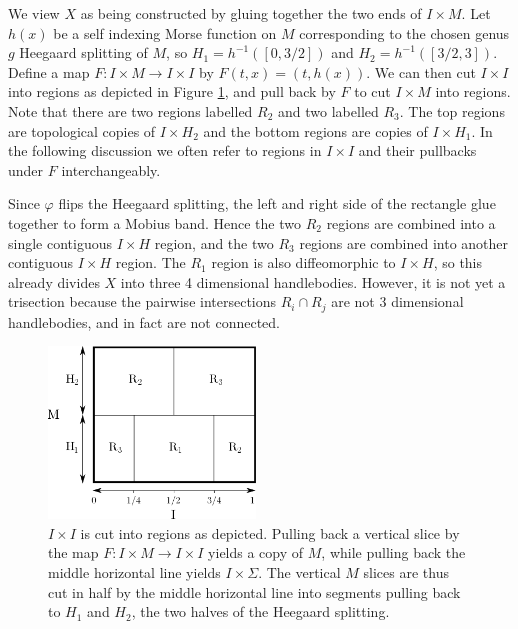 \documentclass[12pt]{amsart}
\theoremstyle{definition}
\theoremstyle{remark}
\begin{document}
We view $X$ as being constructed by gluing together the two ends of $I \times M$.  Let $h(x)$ be a self indexing Morse function on $M$ corresponding to the chosen genus $g$ Heegaard splitting of $M$, so $H_1 = h^{-1}([0,3/2])$ and $H_2  = h^{-1}([3/2,3])$. Define a map $F\colon I \times M \to I \times I$ by $F(t,x) = (t,h(x))$.  We can then cut $I \times I$ into regions as depicted in Figure \ref{flippablebreakdown}, and pull back by $F$ to cut $I \times M$ into regions.  Note that there are two regions labelled $R_2$ and two labelled $R_3$.  The top regions are topological copies of $I \times H_2$ and the bottom regions are copies of $I \times H_1$.  In the following discussion we often refer to regions in $I \times I$ and their pullbacks under $F$ interchangeably.

Since $\varphi$ flips the Heegaard splitting, the left and right side of the rectangle glue together to form a Mobius band.  Hence the two $R_2$ regions are combined into a single contiguous $I \times H$ region, and the two $R_3$ regions are combined into another contiguous $I \times H$ region.  The $R_1$ region is also diffeomorphic to $I \times H$, so this already divides $X$ into three 4 dimensional handlebodies.  However, it is not yet a trisection because the pairwise intersections $R_i \cap R_j$ are not 3 dimensional handlebodies, and in fact are not connected.

\begin{figure}[h]
\centering
\includegraphics[height=1.8in]{MxS1_flippable.png}
\caption{$I \times I$ is cut into regions as depicted.  Pulling back a vertical slice by the map $F\colon I \times M \to I \times I$ yields a copy of $M$, while pulling back the middle horizontal line yields $I \times \Sigma$.  The vertical $M$ slices are thus cut in half by the middle horizontal line into segments pulling back to $H_1$ and $H_2$, the two halves of the Heegaard splitting.}
\label{flippablebreakdown}
\end{figure}
 
\end{document}
